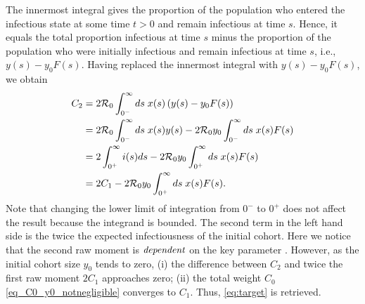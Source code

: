 The innermost integral gives the  proportion of the population who entered the infectious state at some time $t>0$ and remain infectious at time $s$. Hence, it equals the total proportion infectious  at time $s$ minus the proportion of the population who were initially infectious and remain infectious at time $s$, i.e., $y(s) - y_0F(s).$ Having replaced the innermost integral with $y(s) - y_0F(s)$, we obtain
 \begin{align*}
	C_2 & = 2{\mathcal R}_{\mathrm{0}} \int_{0^-}^\infty ds\;x(s) \left( y(s) - y_0F(s) \right) \\
	& = 2{\mathcal R}_{\mathrm{0}} \int_{0^-}^\infty ds\;x(s)y(s) -2{\mathcal R}_{\mathrm{0}} y_0 \int_{0^-}^\infty ds\;x(s) F(s) \\
		& = 2 \int_{0^+}^\infty i(s)ds -2{\mathcal R}_{\mathrm{0}} y_0 \int_{0^+}^\infty ds\;x(s) F(s)  \\
		& = 2C_1 - 2{\mathcal R}_{\mathrm{0}} y_0\int_{0^+}^\infty ds\;x(s) F(s).
\end{align*}
Note that changing the lower limit of integration from $0^-$ to $0^+$ does not affect the result because the integrand is bounded.
The second term in the left hand side is the twice the expected infectiousness of the initial cohort.
Here we notice that the second raw moment is $\emph{dependent}$ on the key parameter \Ro. However, 
 as the initial cohort size $y_0$ tends to zero,  (i) the difference between $C_2$ and twice the first raw moment $2C_1$ approaches zero; (ii) the total weight $C_0$~ \eqref{eq_C0_y0_notnegligible} converges to $C_1$. Thus, \autoref{eq:target} is retrieved.

